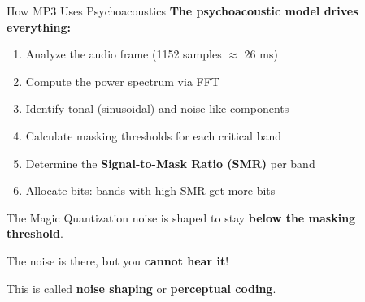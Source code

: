 \documentclass[aspectratio=169,12pt]{beamer}
\begin{document}
\begin{frame}{How MP3 Uses Psychoacoustics}
    \textbf{The psychoacoustic model drives everything:}
    
    \vspace{0.3cm}
    \begin{enumerate}
        \item Analyze the audio frame (1152 samples $\approx$ 26 ms)
        \item Compute the power spectrum via FFT
        \item Identify tonal (sinusoidal) and noise-like components
        \item Calculate masking thresholds for each critical band
        \item Determine the \textbf{Signal-to-Mask Ratio (SMR)} per band
        \item Allocate bits: bands with high SMR get more bits
    \end{enumerate}
    
    \vspace{0.3cm}
    \begin{block}{The Magic}
        Quantization noise is shaped to stay \textbf{below the masking threshold}.
        
        The noise is there, but you \textbf{cannot hear it}!
        
        This is called \textbf{noise shaping} or \textbf{perceptual coding}.
    \end{block}
\end{frame}
\end{document}
